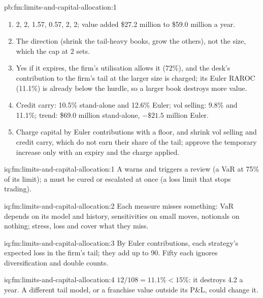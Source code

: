\begin{solution}{pb:fm:limits-and-capital-allocation:1}
\begin{enumerate}
\item 2, 2, 1.57, 0.57, 2, 2; value added \$27.2 million to \$59.0 million a year.
\item The direction (shrink the tail-heavy books, grow the others), not the size, which the cap at 2 sets.
\item Yes if it expires, the firm's utilisation allows it (72\%), and the desk's contribution to the firm's tail at the larger size is charged;
its Euler RAROC (11.1\%) is already below the hurdle, so a larger book destroys more value.
\item Credit carry: 10.5\% stand-alone and 12.6\% Euler; vol selling: 9.8\% and 11.1\%; trend: \$69.0 million stand-alone, $-\$21.5$ million Euler.
\item Charge capital by Euler contributions with a floor, and shrink vol selling and credit carry, which do not earn their share of the tail;
approve the temporary increase only with an expiry and the charge applied.
\end{enumerate}
\end{solution}

\begin{solution}{iq:fm:limits-and-capital-allocation:1}
A  warns and triggers a review (a VaR at 75\% of its limit); a  must be cured or escalated at once (a loss limit that stops
trading).
\end{solution}

\begin{solution}{iq:fm:limits-and-capital-allocation:2}
Each measure misses something: VaR depends on its model and history, sensitivities on small moves, notionals on nothing; stress, loss and
 cover what they miss.
\end{solution}

\begin{solution}{iq:fm:limits-and-capital-allocation:3}
By Euler contributions, each strategy's expected loss in the firm's tail; they add up to 90. Fifty each ignores diversification and double counts.
\end{solution}

\begin{solution}{iq:fm:limits-and-capital-allocation:4}
$12/108=11.1\%<15\%$: it destroys 4.2 a year. A different tail model, or a franchise value outside its P\&L, could change it.
\end{solution}

